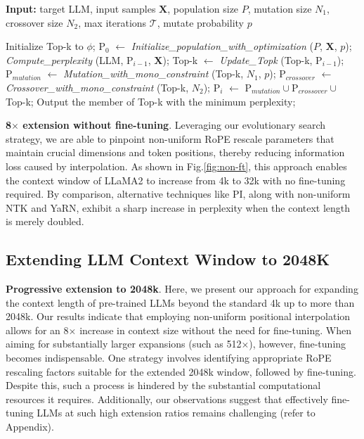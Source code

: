 \begin{algorithm}[t]
	\small
	\caption{The search algorithm}
	\textbf{Input:} target LLM, input samples $\mathbf{X}$,   population size $P$, mutation size $N_1$, crossover size $N_2$, max iterations $\mathcal{T}$, mutate probability $p$\\

	\begin{algorithmic}[1]
		\label{alg:search}
		\STATE Initialize Top-k to $\phi$;	
		\STATE $\text{P}_0$ $\leftarrow$ \textit{Initialize\_population\_with\_optimization} ($P$, $\mathbf{X}$, $p$);
		\STATE \textit{Compute\_perplexity} (LLM, $\text{P}_{i-1}$, $\mathbf{X}$);
		\STATE  Top-k $\leftarrow$ \textit{Update\_Topk} (Top-k, $\text{P}_{i-1}$);
		\STATE $\text{P}_{mutation}$ $\leftarrow$ \textit{Mutation\_with\_mono\_constraint} (Top-k, $N_1$, $p$);
		\STATE $\text{P}_{crossover}$ $\leftarrow$ \textit{Crossover\_with\_mono\_constraint} (Top-k, $N_2$);
		\STATE $\text{P}_i$ $\leftarrow$ $\text{P}_{mutation} \cup \text{P}_{crossover} \cup$ Top-k;
		\ENDFOR
		\STATE Output the member of Top-k with the minimum perplexity;
	\end{algorithmic}
\end{algorithm}

\textbf{8$\times$ extension without fine-tuning}. Leveraging our evolutionary search strategy, we are able to pinpoint non-uniform RoPE rescale parameters that maintain crucial dimensions and token positions, thereby reducing information loss caused by interpolation. As shown in Fig.\ref{fig:non-ft}, this approach enables the context window of LLaMA2 to increase from 4k to 32k with no fine-tuning required. By comparison, alternative techniques like PI, along with non-uniform NTK and YaRN, exhibit a sharp increase in perplexity when the context length is merely doubled.

\subsection{Extending LLM Context Window to 2048K}
\label{sec:extendto2048k}

\textbf{Progressive extension to 2048k}. Here, we present our approach for expanding the context length of pre-trained LLMs beyond the standard 4k up to more than 2048k. Our results indicate that employing non-uniform positional interpolation allows for an 8$\times$ increase in context size without the need for fine-tuning. When aiming for substantially larger expansions (such as 512$\times$), however, fine-tuning becomes indispensable. One strategy involves identifying appropriate RoPE rescaling factors suitable for the extended 2048k window, followed by fine-tuning. Despite this, such a process is hindered by the substantial computational resources it requires. Additionally, our observations suggest that effectively fine-tuning LLMs at such high extension ratios remains challenging (refer to Appendix).


